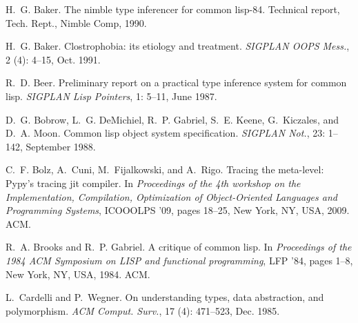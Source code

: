 \documentclass[9pt]{sigplanconf}
\begin{document}
\begin{thebibliography}{42}
H.~G. Baker.
\newblock The nimble type inferencer for common lisp-84.
\newblock Technical report, Tech. Rept., Nimble Comp, 1990.

H.~G. Baker.
\newblock Clostrophobia: its etiology and treatment.
\newblock \emph{SIGPLAN OOPS Mess.}, 2 (4): 4--15, Oct. 1991.

R.~D. Beer.
\newblock Preliminary report on a practical type inference system for common
  lisp.
\newblock \emph{SIGPLAN Lisp Pointers}, 1: 5--11, June 1987.

D.~G. Bobrow, L.~G. DeMichiel, R.~P. Gabriel, S.~E. Keene, G.~Kiczales, and
  D.~A. Moon.
\newblock Common lisp object system specification.
\newblock \emph{SIGPLAN Not.}, 23: 1--142, September 1988.

C.~F. Bolz, A.~Cuni, M.~Fijalkowski, and A.~Rigo.
\newblock Tracing the meta-level: Pypy's tracing jit compiler.
\newblock In \emph{Proceedings of the 4th workshop on the Implementation,
  Compilation, Optimization of Object-Oriented Languages and Programming
  Systems}, ICOOOLPS '09, pages 18--25, New York, NY, USA, 2009. ACM.

R.~A. Brooks and R.~P. Gabriel.
\newblock A critique of common lisp.
\newblock In \emph{Proceedings of the 1984 ACM Symposium on LISP and functional
  programming}, LFP '84, pages 1--8, New York, NY, USA, 1984. ACM.

L.~Cardelli and P.~Wegner.
\newblock On understanding types, data abstraction, and polymorphism.
\newblock \emph{ACM Comput. Surv.}, 17 (4): 471--523, Dec.
  1985.


\end{thebibliography}
\end{document}
